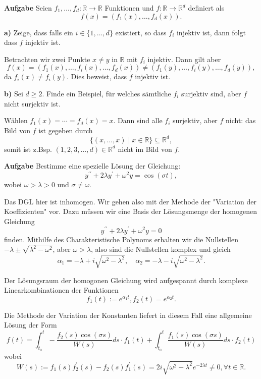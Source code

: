 


\textbf{Aufgabe} Seien $f_{1}, \ldots, f_{d}: \mathbb{R} \rightarrow \mathbb{R}$
Funktionen und $f: \mathbb{R} \rightarrow \mathbb{R}^{d}$ definiert als
$$f(x)=\left(f_{1}(x), \ldots, f_{d}(x)\right) .$$

\textbf{a)} Zeige, dass falls ein $i \in\{1, \ldots, d\}$ existiert, so dass $f_{i}$
injektiv ist, dann folgt dass $f$ injektiv ist.

Betrachten wir zwei Punkte $x \neq y$ in $\mathbb{R}$ mit $f_{i}$ injektiv. Dann gilt
aber
$$ f(x)=\left(f_{1}(x), \ldots, f_{i}(x), \ldots, f_{d}(x)\right) \neq\left(f_{1}(y),
\ldots, f_{i}(y), \ldots, f_{d}(y)\right), $$
da $f_{i}(x) \neq f_{i}(y)$. Dies beweist, dass $f$ injektiv ist. \smallskip

\textbf{b)} Sei $d \geq 2$. Finde ein Beispiel, für welches sämtliche $f_{i}$
surjektiv sind, aber $f$ nicht surjektiv ist.

Wählen $f_{1}(x)=\cdots=f_{d}(x)=x$. Dann sind alle $f_{i}$ surjektiv, aber $f$
nicht: das Bild von $f$ ist gegeben durch
$$\{(x, \ldots, x) \mid x \in \mathbb{R}\} \subseteq \mathbb{R}^{d},$$
somit ist z.Bsp. $(1,2,3, \ldots, d) \in \mathbb{R}^{d}$ nicht im Bild von $f$.

\hrulefill

\textbf{Aufgabe} Bestimme eine spezielle Lösung der Gleichung:
$$y^{\prime \prime}+2 \lambda y^{\prime}+\omega^{2} y=\cos (\sigma t),$$
wobei $\omega>\lambda>0$ und $\sigma \neq \omega$. \smallskip

Das DGL hier ist inhomogen. Wir gehen also mit der Methode der "Variation der Koeffizienten"
vor. Dazu müssen wir eine Basis der Lösungsmenge der homogenen Gleichung
$$ y^{\prime \prime}+2 \lambda y^{\prime}+\omega^{2} y=0$$
finden. Mithilfe des Charakteristische Polynoms erhalten wir die Nullstellen 
$-\lambda \pm \sqrt{\lambda^{2}-\omega^{2}}$, aber $\omega>\lambda$, 
also sind die Nullstellen komplex und gleich
$$\alpha_{1}=-\lambda+i \sqrt{\omega^{2}-\lambda^{2}}, \quad \alpha_{2}=-\lambda-i \sqrt{\omega^{2}-\lambda^{2}} .$$

Der Lösungsraum der homogonen Gleichung wird aufgespannt durch komplexe Linearkombinationen der Funktionen
$$f_{1}(t):=e^{\alpha_{1} t}, f_{2}(t)=e^{\alpha_{2} t} .$$

Die Methode der Variation der Konstanten liefert in diesem Fall eine allgemeine Lösung
der Form
$$f(t)=\int_{t_{0}}^{t}-\frac{f_{2}(s) \cos (\sigma s)}{W(s)} d s \cdot
f_{1}(t)+\int_{t_{0}}^{t} \frac{f_{1}(s) \cos (\sigma s)}{W(s)} d s \cdot f_{2}(t)$$
wobei
$$W(s):=f_{1}(s) f_{2}^{\prime}(s)-f_{2}(s) f_{1}^{\prime}(s) 
=2 i \sqrt{\omega^{2}-\lambda^{2}} e^{-2 \lambda t} \neq 0, \forall t \in \mathbb{R} .$$

